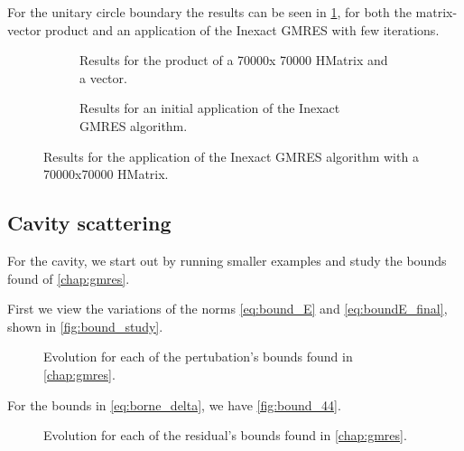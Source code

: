 For the unitary circle boundary the results can be seen in \ref{fig:Helmholtz_circle_results}, for both the matrix-vector product and an application of the Inexact GMRES with few iterations.

\begin{figure}[h!]
    \centering
    \begin{subfigure}[b]{0.45\linewidth}
        
        \caption{Results for the product of a 70000x 70000 HMatrix and a vector.}
    \end{subfigure}
    \begin{subfigure}[b]{0.45\linewidth}
        
        \caption{Results for an initial application of the Inexact GMRES algorithm.}
    \end{subfigure}
    \caption{Results for the application of the Inexact GMRES algorithm with a 70000x70000 HMatrix.}
    \label{fig:Helmholtz_circle_results}
\end{figure}

\subsection{Cavity scattering}

For the cavity, we start out by running smaller examples and study the bounds found of \autoref{chap:gmres}.

First we view the variations of the norms \ref{eq:bound_E} and \ref{eq:boundE_final}, shown in \autoref{fig:bound_study}.

\begin{figure}[h!]
    \centering
    
    \caption{Evolution for each of the pertubation's bounds found in \autoref{chap:gmres}.}
    \label{fig:bound_study}
\end{figure}


For the bounds in \ref{eq:borne_delta}, we have \autoref{fig:bound_44}.

\begin{figure}[h!]
    \centering
    
    \caption{Evolution for each of the residual's bounds found in \autoref{chap:gmres}.}
    \label{fig:bound_44}
\end{figure}

